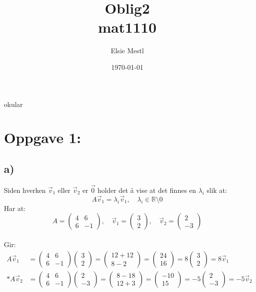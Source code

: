 okular\documentclass[a4paper, norsk, twoside, 10pt]{article}
\date{\today}
\title{Oblig2 \\ mat1110}
\author{Elsie Mestl}
\begin{document}
\maketitle
  \section*{Oppgave 1:}


  
  \subsection*{a)}

  Siden hverken $\vec{v}_{1}$ eller $\vec{v}_{2}$ er $\vec{0}$ holder det å vise at det finnes en $\lambda_{i}$ slik at:
  \[A\vec{v}_{1}  = \lambda_{i} \vec{v}_{1} , \quad \lambda_{i} \in \mathbb{R}\setminus{0} \]
  Har at: 
  \def\matriseA{
  \begin{pmatrix}
    4 & 6 \\
    6 & -1
  \end{pmatrix}
  }
  \def\ven{
  \begin{pmatrix}
    3 \\
    2
  \end{pmatrix}
  }
  \def\vto{
  \begin{pmatrix}
    2\\
    -3
  \end{pmatrix}
  }
  \[A = \matriseA, \quad \vec{v}_{1} = \ven, \quad \vec{v}_{2} = \vto\]
  \\
Gir:
\[\begin{split}
A\vec{v}_{1} &= \matriseA \ven =
\begin{pmatrix}
  12 +12 \\
  8 - 2
\end{pmatrix}
=
\begin{pmatrix}
  24 \\
  16
\end{pmatrix}
= 8 \ven = 8 \vec{v}_{1} \\*
A\vec{v}_{2} &= \matriseA \vto =
\begin{pmatrix}
  8 - 18 \\
  12 +3
\end{pmatrix}
=
\begin{pmatrix}
  -10 \\
  15
\end{pmatrix}
= -5 \vto = -5 \vec{v}_{2}
\end{split}
\]
\end{document}

